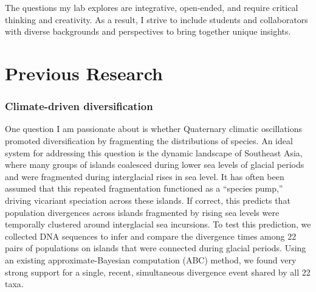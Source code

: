 The questions my lab explores are integrative, open-ended, and require critical
thinking and creativity.
As a result,
I strive to include students and collaborators with diverse backgrounds and
perspectives to bring together unique insights.

\section*{Previous Research}
\subsubsection*{Climate-driven diversification}
One question I am passionate about is whether Quaternary climatic oscillations
promoted diversification by fragmenting the distributions of species.
An ideal system for addressing this question is the dynamic landscape of
Southeast Asia, where many groups of islands coalesced during lower sea levels
of glacial periods and were fragmented during interglacial rises in sea level.
It has often been assumed that this repeated fragmentation functioned as a
``species pump,'' driving vicariant speciation across these islands.
If correct, this predicts that population divergences across islands fragmented
by rising sea levels were temporally clustered around interglacial sea
incursions.
To test this prediction, we collected DNA sequences to infer and compare the
divergence times among 22 pairs of populations on islands that were connected
during glacial periods.
Using an existing approximate-Bayesian computation (ABC) method, we found very
strong support
for a single, recent, simultaneous divergence event shared by all 22 taxa.

